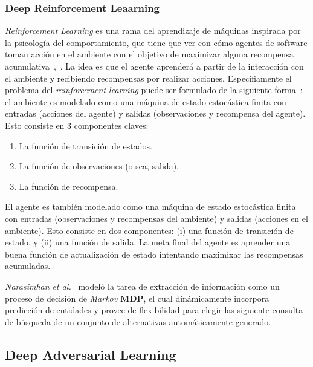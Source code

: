 \subsubsection{Deep Reinforcement Leaarning}

\emph{Reinforcement Learning} es una rama del aprendizaje de m\'aquinas inspirada por la psicolog\'ia del comportamiento, que tiene que ver con c\'omo agentes de software toman acci\'on en el ambiente con el objetivo de maximizar alguna recompensa acumulativa~\cite{kaelbling1996reinforcement},~\cite{sutton1998introduction}. La idea es que el agente aprender\'a a partir de la interacci\'on con el ambiente y recibiendo recompensas por realizar acciones. Especifiamente el problema del \emph{reinforcement learning} puede ser formulado de la siguiente forma~\cite{hoi2018online}: el ambiente es modelado como una m\'aquina de estado estoc\'astica finita con entradas (acciones del agente) y salidas (observaciones y recompensa del agente). Esto consiste en 3 componentes claves:
 
 \begin{enumerate}
 	\item La funci\'on de transici\'on de estados.
 	\item La funci\'on de observaciones (o sea, salida).
 	\item La funci\'on de recompensa.
 \end{enumerate}
 
El agente es tambi\'en modelado como una m\'aquina de estado estoc\'astica finita con entradas (observaciones y recompensas del ambiente) y salidas (acciones en el ambiente). Esto consiste en dos componentes: (i) una funci\'on de transici\'on de estado, y (ii) una funci\'on de salida. La meta final del agente es aprender una buena funci\'on de actualizaci\'on de estado intentando maximixar las recompensas acumuladas.

\emph{Narasimhan et al.}~\cite{narasimhan2016improving} model\'o la tarea de extracci\'on de informaci\'on como un proceso de decisi\'on de \emph{Markov} \textbf{MDP}, el cual din\'amicamente incorpora predicci\'on de entidades y provee de flexibilidad para elegir las siguiente consulta de b\'usqueda de un conjunto de alternativas autom\'aticamente generado.

\subsection{Deep Adversarial Learning}

